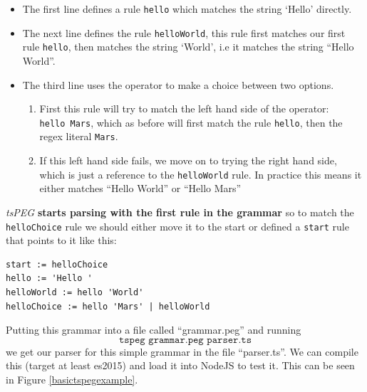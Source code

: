 \begin{itemize}

\item
  The first line defines a rule \texttt{hello} which matches the string
  `Hello' directly.
\item
  The next line defines the rule \texttt{helloWorld}, this rule first
  matches our first rule \texttt{hello}, then matches the string
  `World', i.e it matches the string ``Hello World''.
\item
  The third line uses the \texttt{\textbar{}} operator to make a choice
  between two options.

  \begin{enumerate}
  \def\labelenumi{\arabic{enumi}.}

  \item
    First this rule will try to match the left hand side of the
    operator: \texttt{hello\ \textquotesingle{}Mars\textquotesingle{}},
    which as before will first match the rule \texttt{hello}, then the
    regex literal \texttt{Mars}.
  \item
    If this left hand side fails, we move on to trying the right hand
    side, which is just a reference to the \texttt{helloWorld} rule. In
    practice this means it either matches ``Hello World'' or ``Hello
    Mars''
  \end{enumerate}
\end{itemize}

\emph{tsPEG} \textbf{starts parsing with the first rule in the grammar}
so to match the \texttt{helloChoice} rule we should either move it to
the start or defined a \texttt{start} rule that points to it like this:

\begin{verbatim}
start := helloChoice
hello := 'Hello '
helloWorld := hello 'World'
helloChoice := hello 'Mars' | helloWorld
\end{verbatim}

Putting this grammar into a file called ``grammar.peg'' and running
\[\texttt{tspeg\ grammar.peg\ parser.ts}\]
we get our parser for this simple
grammar in the file ``parser.ts''. We can compile this (target at least
es2015) and load it into NodeJS to test it. This can be seen in Figure \ref{basictspegexample}.

